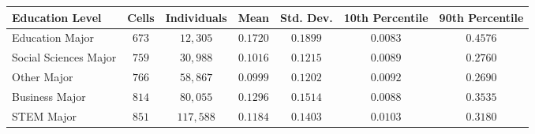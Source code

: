 \begin{tabular}{lcccccc}
\toprule
Education Level&Cells&Individuals&Mean&Std. Dev.&10th Percentile&90th Percentile\tabularnewline
\midrule
Education Major&$673$&$ 12,305$&$0.1720$&$0.1899$&$0.0083$&$0.4576$\tabularnewline
Social Sciences Major&$759$&$ 30,988$&$0.1016$&$0.1215$&$0.0089$&$0.2760$\tabularnewline
Other Major&$766$&$ 58,867$&$0.0999$&$0.1202$&$0.0092$&$0.2690$\tabularnewline
Business Major&$814$&$ 80,055$&$0.1296$&$0.1514$&$0.0088$&$0.3535$\tabularnewline
STEM Major&$851$&$117,588$&$0.1184$&$0.1403$&$0.0103$&$0.3180$\tabularnewline
\bottomrule
\end{tabular}

